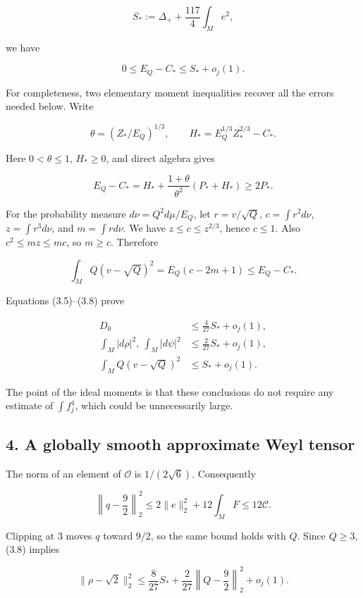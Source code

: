 \documentclass[
  10pt,
]{article}
\begin{document}
\[
                        S_*:=\Delta_++\frac{117}{4}\int_Me^2,
\]

we have

\[
                     0\le E_Q-C_*\le S_*+o_j(1).         \tag{3.6}
\]

For completeness, two elementary moment inequalities recover all the
errors needed below. Write

\[
 \theta=(Z_*/E_Q)^{1/3},\qquad
 H_*=E_Q^{1/3}Z_*^{2/3}-C_*.
\]

Here \(0<\theta\le1\), \(H_*\ge0\), and direct algebra gives

\[
 E_Q-C_*=H_*+\frac{1+\theta}{\theta^2}(P_*+H_*)\ge2P_*.
 \tag{3.7}
\]

For the probability measure \(d\nu=Q^2d\mu/E_Q\), let \(r=v/\sqrt Q\),
\(c=\int r^2d\nu\), \(z=\int r^3d\nu\), and \(m=\int rd\nu\). We have
\(z\le c\le z^{2/3}\), hence \(c\le1\). Also \(c^2\le mz\le mc\), so
\(m\ge c\). Therefore

\[
 \int_M Q(v-\sqrt Q)^2=E_Q(c-2m+1)\le E_Q-C_*.
 \tag{3.8}
\]

Equations (3.5)--(3.8) prove

\[
 \begin{aligned}
 D_0&\le\frac4{27}S_*+o_j(1),\\
 \int_M|d\rho|^2,\ \int_M|d\psi|^2
     &\le\frac2{27}S_*+o_j(1),\\
 \int_MQ(v-\sqrt Q)^2&\le S_*+o_j(1).
 \end{aligned}                                              \tag{3.9}
\]

The point of the ideal moments is that these conclusions do not require
any estimate of \(\int f_j^4\), which could be unnecessarily large.

\hypertarget{a-globally-smooth-approximate-weyl-tensor}{%
\subsection{4. A globally smooth approximate Weyl
tensor}\label{a-globally-smooth-approximate-weyl-tensor}}

The norm of an element of \(\mathcal O\) is \(1/(2\sqrt6)\).
Consequently

\[
 \left\|q-\frac92\right\|_2^2
       \le2\|e\|_2^2+12\int_MF\le12\mathcal C.           \tag{4.1}
\]

Clipping at \(3\) moves \(q\) toward \(9/2\), so the same bound holds
with \(Q\). Since \(Q\ge3\), (3.8) implies

\[
 \|\rho-\sqrt2\|_2^2
  \le\frac8{27}S_*+\frac2{27}\left\|Q-\frac92\right\|_2^2+o_j(1).
 \tag{4.2}
\]
\end{document}
